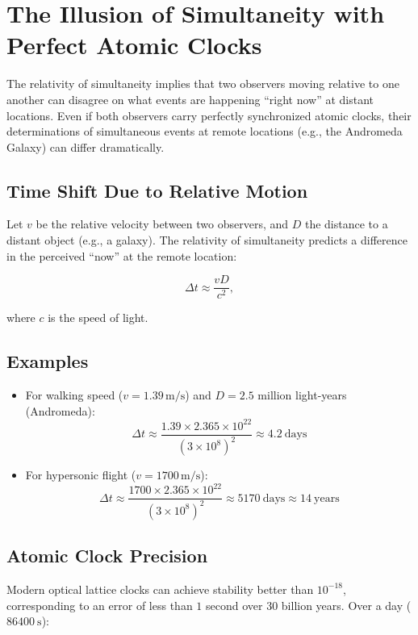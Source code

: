 \documentclass[../../../OAE-SPEC-MAIN.tex]{subfiles}
\begin{document}
\section{The Illusion of Simultaneity with Perfect Atomic Clocks}

The relativity of simultaneity implies that two observers moving relative to one another can disagree on what events are happening ``right now'' at distant locations. Even if both observers carry perfectly synchronized atomic clocks, their determinations of simultaneous events at remote locations (e.g., the Andromeda Galaxy) can differ dramatically.

\subsection{Time Shift Due to Relative Motion}

Let $v$ be the relative velocity between two observers, and $D$ the distance to a distant object (e.g., a galaxy). The relativity of simultaneity predicts a difference in the perceived ``now'' at the remote location:

\begin{equation}
\Delta t \approx \frac{v D}{c^2},
\end{equation}

where $c$ is the speed of light.

\subsection*{Examples}
\begin{itemize}
  \item For walking speed ($v = 1.39\,\mathrm{m/s}$) and $D = 2.5$ million light-years (Andromeda):
  \[ \Delta t \approx \frac{1.39 \times 2.365\times10^{22}}{(3\times10^8)^2} \approx 4.2\ \text{days} \]

  \item For hypersonic flight ($v = 1700\,\mathrm{m/s}$):
  \[ \Delta t \approx \frac{1700 \times 2.365\times10^{22}}{(3\times10^8)^2} \approx 5170\ \text{days} \approx 14\ \text{years} \]
\end{itemize}

\subsection{Atomic Clock Precision}

Modern optical lattice clocks can achieve stability better than $10^{-18}$, corresponding to an error of less than $1$ second over $30$ billion years. Over a day ($86400\ \text{s}$):
\end{document}
